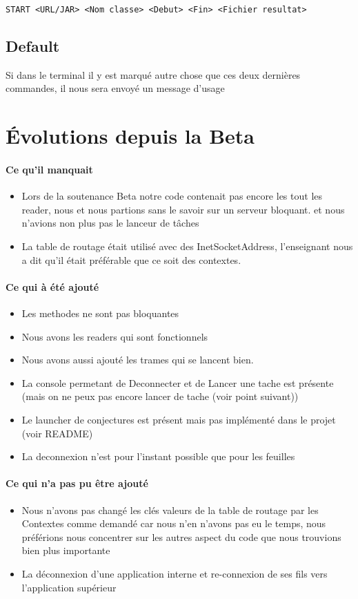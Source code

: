\documentclass[a4paper,titlepage]{report}
\begin{document}
\begin{lstlisting}
START <URL/JAR> <Nom classe> <Debut> <Fin> <Fichier resultat>
\end{lstlisting}
\subsection{Default}
Si dans le terminal il y est marqué autre chose que ces deux dernières commandes, il nous sera envoyé un message d'usage








\pagebreak
\section{Évolutions depuis la Beta}
\paragraph{Ce qu'il manquait}
\begin{itemize}
\item Lors de la soutenance Beta notre code contenait pas encore les tout les reader, nous et nous partions sans le savoir sur un serveur bloquant. et nous n'avions non plus pas le lanceur de tâches 
\item La table de routage était utilisé avec des InetSocketAddress, l'enseignant nous a dit qu'il était préférable que ce soit des contextes.
\end{itemize}
\paragraph{Ce qui à été ajouté}
\begin{itemize}
\item Les methodes ne sont pas bloquantes
\item Nous avons les readers qui sont fonctionnels
\item Nous avons aussi ajouté les trames qui se lancent bien.
\item La console permetant de Deconnecter et de Lancer une tache est présente (mais on ne peux pas encore lancer de tache (voir point suivant))
\item Le launcher de conjectures est présent mais pas implémenté dans le projet (voir README)
\item La deconnexion n'est pour l'instant possible que pour les feuilles
\end{itemize}
\paragraph{Ce qui n'a pas pu être ajouté}
\begin{itemize}
\item Nous n'avons pas changé les clés valeurs de la table de routage par les Contextes comme demandé car nous n'en n'avons pas eu le temps, nous préférions nous concentrer sur les autres aspect du code que nous trouvions bien plus importante
\item La déconnexion d'une application interne et re-connexion de ses fils vers l'application supérieur
\end{itemize}
\end{document}
